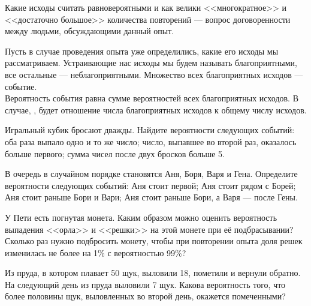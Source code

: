 \documentclass[a4paper,12pt]{article}
\begin{document}
Какие исходы считать равновероятными и как велики <<многократное>> и <<достаточно большое>> количества повторений --- вопрос договоренности между людьми, обсуждающими данный опыт. %

  Пусть в случае проведения опыта уже определились, какие его исходы мы рассматриваем. Устраивающие нас исходы мы будем называть  благоприятными, все остальные ---  неблагоприятными. Множество всех благоприятных исходов ---  событие.\\
  Вероятность события равна сумме вероятностей всех благоприятных исходов.
  В случае, ,  будет отношение числа благоприятных исходов к общему числу исходов.


  Игральный кубик бросают дважды. Найдите вероятности следующих событий:  оба раза выпало одно и то же число;  число, выпавшее во второй раз, оказалось больше первого;  сумма чисел после двух бросков больше 5.

  В очередь в случайном порядке становятся Аня, Боря, Варя и Гена. Определите вероятности следующих событий:  Аня стоит первой;  Аня стоит рядом с Борей;  Аня стоит раньше Бори и Вари;  Аня стоит раньше Бори, а Варя --- после Гены.

  У Пети есть погнутая монета. 
  Каким образом можно оценить вероятность выпадения <<орла>> и <<решки>> на этой монете при её подбрасывании?
  Сколько раз нужно подбросить монету, чтобы при повторении опыта доля решек изменилась не более на 1\%
  с вероятностью 99\%?


  Из пруда, в котором плавает 50 щук, выловили 18, пометили и вернули обратно. На следующий день из пруда выловили 7 щук. Какова вероятность того, что более половины щук, выловленных во второй день, окажется помеченными?
\end{document}
